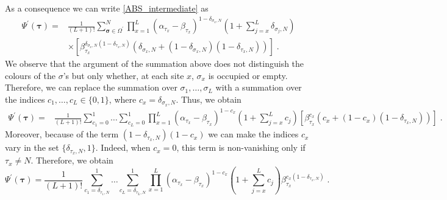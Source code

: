 \documentclass[10pt]{article}
\numberwithin{equation}{section}
\numberwithin{equation}{subsection}
\newcommand{\dt}{\;.}
\newcommand{\fra}[1]{\textcolor[rgb]{0,0,1}{#1}}
\begin{document}
As a consequence we can write \eqref{ABS_intermediate} as 
\begin{align}
\Psi^{'}(\bm{\tau})
=&\frac{1}{(L+1)!}\sum_{\bm{\sigma}\in \Omega^{'}}^{N}\prod_{x=1}^{L}\left(\alpha_{\tau_{x}}-\beta_{\tau_{x}}\right)^{1-\delta_{\sigma_{x},N}}\left(1+\sum_{j=x}^{L}\delta_{\sigma_{j},N}\right)\nonumber\\&\times\left[\beta_{\tau_{x}}^{\delta_{\sigma_{x},N}(1-\delta_{\tau_{x},N})}\left(\delta_{\sigma_{x},N}+(1-\delta_{\sigma_{x},N})(1-\delta_{\tau_{x},N})\right)\right]\dt
\end{align}
We observe that the argument of the summation above does not distinguish the colours of the $\sigma$'s but only whether, at each site $x$, $\sigma_{x}$ is occupied or empty. Therefore, we can replace the summation over $\sigma_{1},\ldots,\sigma_{L}$ with a summation over the indices  $c_{1},\ldots,c_{L}\in \{0,1\}$\fra{, where $c_{x}=\delta_{\sigma_{x},N}$}. Thus, we obtain 
\begin{align}
\Psi^{'}(\bm{\tau})	=&\frac{1}{(L+1)!}\sum_{c_{1}=0}^{1}\ldots\sum_{c_{L}=0}^{1}\prod_{x=1}^{L}\left(\alpha_{\tau_{x}}-\beta_{\tau_{x}}\right)^{1-c_{x}}\left(1+\sum_{j=x}^{L}c_{j}\right)\left[\beta_{\tau_{x}}^{c_{x}}\left(c_{x}+(1-c_{x})(1-\delta_{\tau_{x},N})\right)\right]\dt
\end{align}
Moreover, because of the term $(1-\delta_{\tau_{x},N})(1-c_{x})$ we can make the indices $c_{x}$ vary in the set $\{\delta_{\tau_{x},N},1\}$. Indeed, when $c_{x}=0$, this term is non-vanishing only if $\tau_{x}\neq N$. Therefore, we obtain 
\begin{equation}
	\Psi^{'}(\bm{\tau})=\frac{1}{(L+1)!}\sum_{c_{1}=\delta_{\tau_{1},N}}^{1}\ldots\sum_{c_{L}=\delta_{\tau_{L},N}}^{1}\prod_{x=1}^{L}\left(\alpha_{\tau_{x}}-\beta_{\tau_{x}}\right)^{1-c_{x}}\left(1+\sum_{j=x}^{L}c_{j}\right)\beta_{\tau_{x}}^{c_{x}(1-\delta_{\tau_{x},N})}\dt
\end{equation}
\end{document}
